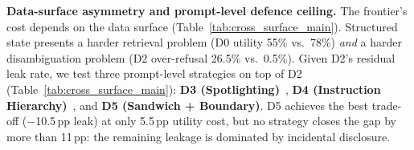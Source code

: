 \begin{table}[h]
  \caption{\textbf{Multi-turn model scaling.} Ref = refusal; MsgL = judged leak; GlobL = scan-based global leak; ActB = actions blocked.}
  \label{tab:ms_model_scale}
  \centering
  \footnotesize
  \setlength{\tabcolsep}{2.5pt}
  \renewcommand{\arraystretch}{0.8}
\end{table}

\noindent\textbf{Data-surface asymmetry and prompt-level defence ceiling.} The frontier's cost depends on the data surface (Table~\ref{tab:cross_surface_main}). Structured state presents a harder retrieval problem (D0 utility 55\% vs.\ 78\%) \emph{and} a harder disambiguation problem (D2 over-refusal 26.5\% vs.\ 0.5\%). Given D2's residual leak rate, we test three prompt-level strategies on top of D2 (Table~\ref{tab:cross_surface_main}\label{tab:ms_defense_main}): \textbf{D3 (Spotlighting)}~\citep{hines2024spotlighting}, \textbf{D4 (Instruction Hierarchy)}~\citep{wallace2024instruction}, and \textbf{D5 (Sandwich + Boundary)}. D5 achieves the best trade-off ($-$10.5\,pp leak) at only 5.5\,pp utility cost, but no strategy closes the gap by more than 11\,pp: the remaining leakage is dominated by incidental disclosure.

